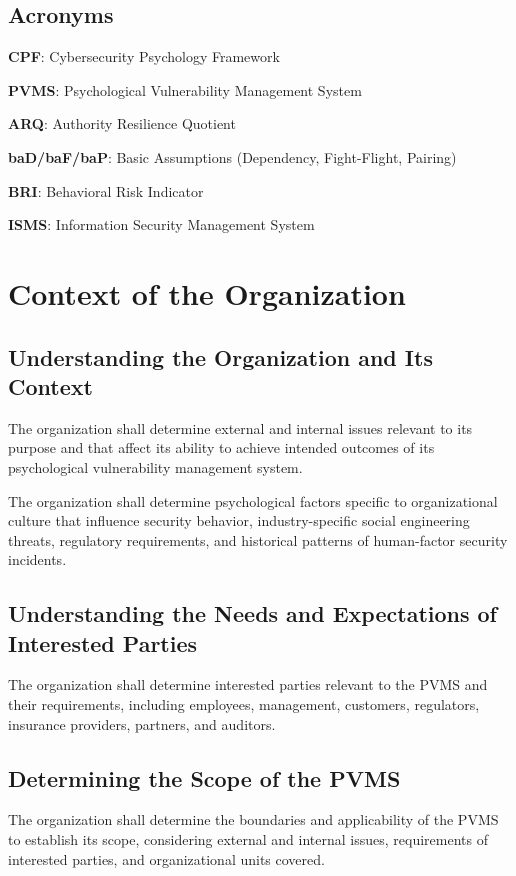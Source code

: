 \documentclass[11pt,a4paper]{article}
\begin{document}
\subsection{Acronyms}

\textbf{CPF}: Cybersecurity Psychology Framework

\textbf{PVMS}: Psychological Vulnerability Management System

\textbf{ARQ}: Authority Resilience Quotient

\textbf{baD/baF/baP}: Basic Assumptions (Dependency, Fight-Flight, Pairing)

\textbf{BRI}: Behavioral Risk Indicator

\textbf{ISMS}: Information Security Management System

\section{Context of the Organization}

\subsection{Understanding the Organization and Its Context}

The organization shall determine external and internal issues relevant to its purpose and that affect its ability to achieve intended outcomes of its psychological vulnerability management system.

The organization shall determine psychological factors specific to organizational culture that influence security behavior, industry-specific social engineering threats, regulatory requirements, and historical patterns of human-factor security incidents.

\subsection{Understanding the Needs and Expectations of Interested Parties}

The organization shall determine interested parties relevant to the PVMS and their requirements, including employees, management, customers, regulators, insurance providers, partners, and auditors.

\subsection{Determining the Scope of the PVMS}

The organization shall determine the boundaries and applicability of the PVMS to establish its scope, considering external and internal issues, requirements of interested parties, and organizational units covered.
\end{document}
